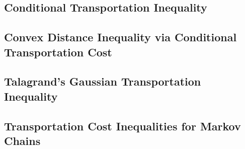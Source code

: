 \documentclass[11pt]{article}
\begin{document}
\subsection{Conditional Transportation Inequality}
\subsection{Convex Distance Inequality via Conditional Transportation Cost}
\subsection{Talagrand's Gaussian Transportation Inequality}
\subsection{Transportation Cost Inequalities for Markov Chains}
\newpage


\end{document}
